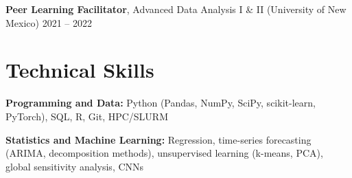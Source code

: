 \documentclass[10pt,letterpaper]{article}
\newcommand{\entry}[2]{%
  \noindent#1\hfill
  {\fontsize{9.8}{12}\selectfont\color{muted}#2}\par
}
\newcommand{\gap}{\vspace{4pt}}
\begin{document}
\gap
\entry{\textbf{Peer Learning Facilitator}, Advanced Data Analysis I \& II (University of New Mexico)}
{2021 -- 2022}

\section*{Technical Skills}\raggedright

\textbf{Programming and Data:} Python (Pandas, NumPy, SciPy, scikit-learn, PyTorch), SQL, R, Git, HPC/SLURM\par\vspace{2pt}

\textbf{Statistics and Machine Learning:} Regression, time-series forecasting (ARIMA, decomposition methods), unsupervised learning (k-means, PCA), global sensitivity analysis, CNNs
\end{document}
